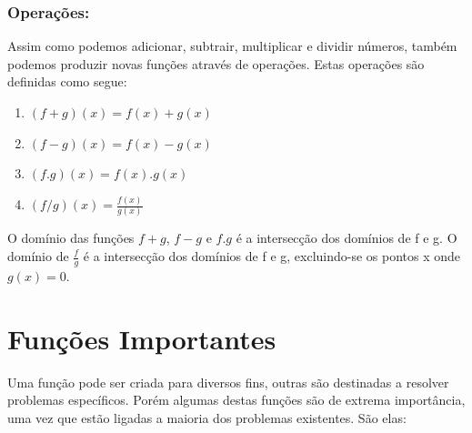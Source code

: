 \documentclass[a4paper,12pt,twoside,BCOR=10mm]{scrbook}
\begin{document}
\begin{titlepage}
\subsubsection{Operações:}
Assim como podemos adicionar, subtrair, multiplicar e dividir números, também podemos produzir novas funções através de operações. Estas operações são definidas como segue:
\\
\begin{enumerate}
Sejam $f$ e $g$ duas funções distintas, temos as operações básicas:
\item $(f + g)(x) = f(x) + g(x)$
\item $(f - g)(x) = f(x) - g(x)$
\item $(f . g)(x) = f(x) . g(x)$
\item $(f / g)(x) = \frac{f(x)}{g(x)}$
\end{enumerate}
O domínio das funções $f+g$, $f-g$ e $f.g$ é a intersecção dos domínios de f e g. O domínio de $\frac{f}{g}$ é a intersecção dos domínios de f e g, excluindo-se os pontos x onde $g(x) = 0$.

\section{Funções Importantes}
Uma função pode ser criada para diversos fins, outras são destinadas a resolver problemas específicos. Porém algumas destas funções são de extrema importância, uma vez que estão ligadas a maioria dos problemas existentes. São elas:


\end{titlepage}
\end{document}

